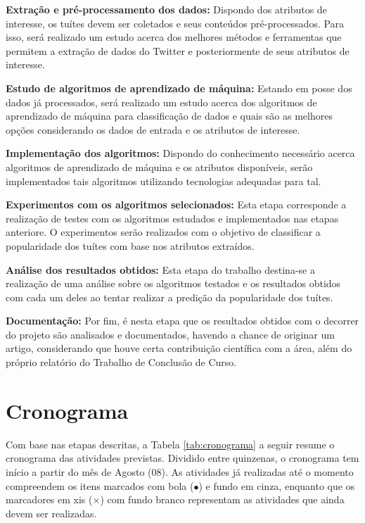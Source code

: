 \documentclass[oneside,openright,12pt]{ufsm_2015} %
\begin{document}
    \par \textbf{Extração e pré-processamento dos dados:} Dispondo dos atributos de interesse, os tuítes devem ser coletados e seus conteúdos pré-processados. Para isso, será realizado um estudo acerca dos melhores métodos e ferramentas que permitem a extração de dados do Twitter e posteriormente de seus atributos de interesse.
    
    \par \textbf{Estudo de algoritmos de aprendizado de máquina:} Estando em posse dos dados já processados, será realizado um estudo acerca dos algoritmos de aprendizado de máquina para classificação de dados e quais são as melhores opções considerando os dados de entrada e os atributos de interesse.
    
    \par \textbf{Implementação dos algoritmos:} Dispondo do conhecimento necessário acerca algoritmos de aprendizado de máquina e os atributos disponíveis, serão implementados tais algoritmos utilizando tecnologias adequadas para tal.
    
    \par \textbf{Experimentos com os algoritmos selecionados:} Esta etapa corresponde a realização de testes com os algoritmos estudados e implementados nas etapas anteriore. O experimentos serão realizados com o objetivo de classificar a popularidade dos tuítes com base nos atributos extraídos.
    
    \par \textbf{Análise dos resultados obtidos:} Esta etapa do trabalho destina-se a realização de uma análise sobre os algoritmos testados e os resultados obtidos com cada um deles ao tentar realizar a predição da popularidade dos tuítes.
    
    \par \textbf{Documentação:} Por fim, é nesta etapa que os resultados obtidos com o decorrer do projeto são analisados e documentados, havendo a chance de originar um artigo, considerando que houve certa contribuição científica com a área, além do próprio relatório do Trabalho de Conclusão de Curso.
    
    \section{Cronograma}
    
    \par Com base nas etapas descritas, a Tabela \ref{tab:cronograma} a seguir resume o cronograma das atividades previstas. Dividido entre quinzenas, o cronograma tem início a partir do mês de Agosto (08). As atividades já realizadas até o momento compreendem os itens marcados com bola ($\bullet$) e fundo em cinza, enquanto que os marcadores em xis ($\times$) com fundo branco representam as atividades que ainda devem ser realizadas.
    
\end{document}
